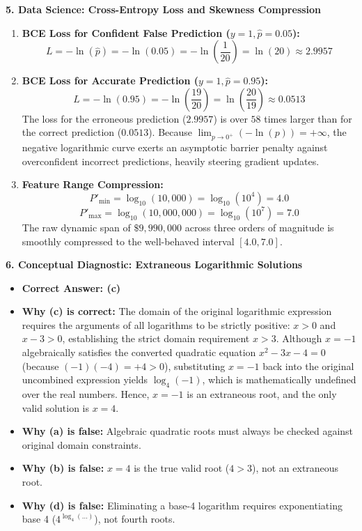 \textbf{5. Data Science: Cross-Entropy Loss and Skewness Compression}
\begin{enumerate}
    \item \textbf{BCE Loss for Confident False Prediction ($y = 1, \hat{p} = 0.05$):}
    $$L = -\ln(\hat{p}) = -\ln(0.05) = -\ln\left(\frac{1}{20}\right) = \ln(20) \approx \mathbf{2.9957}$$
    \item \textbf{BCE Loss for Accurate Prediction ($y = 1, \hat{p} = 0.95$):}
    $$L = -\ln(0.95) = -\ln\left(\frac{19}{20}\right) = \ln\left(\frac{20}{19}\right) \approx \mathbf{0.0513}$$
    The loss for the erroneous prediction ($2.9957$) is over $58$ times larger than for the correct prediction ($0.0513$). Because $\lim_{p \to 0^+} (-\ln(p)) = +\infty$, the negative logarithmic curve exerts an asymptotic barrier penalty against overconfident incorrect predictions, heavily steering gradient updates.
    \item \textbf{Feature Range Compression:}
    $$P'_{\min} = \log_{10}(10{,}000) = \log_{10}(10^4) = \mathbf{4.0}$$
    $$P'_{\max} = \log_{10}(10{,}000{,}000) = \log_{10}(10^7) = \mathbf{7.0}$$
    The raw dynamic span of $\$9{,}990{,}000$ across three orders of magnitude is smoothly compressed to the well-behaved interval $\mathbf{[4.0, 7.0]}$.
\end{enumerate}

\textbf{6. Conceptual Diagnostic: Extraneous Logarithmic Solutions}
\begin{itemize}
    \item \textbf{Correct Answer: (c)}
    \item \textbf{Why (c) is correct:} The domain of the original logarithmic expression requires the arguments of all logarithms to be strictly positive: $x > 0$ and $x - 3 > 0$, establishing the strict domain requirement $x > 3$. Although $x = -1$ algebraically satisfies the converted quadratic equation $x^2 - 3x - 4 = 0$ (because $(-1)(-4) = +4 > 0$), substituting $x = -1$ back into the original uncombined expression yields $\log_4(-1)$, which is mathematically undefined over the real numbers. Hence, $x = -1$ is an extraneous root, and the only valid solution is $x = 4$.
    \item \textbf{Why (a) is false:} Algebraic quadratic roots must always be checked against original domain constraints.
    \item \textbf{Why (b) is false:} $x = 4$ is the true valid root ($4 > 3$), not an extraneous root.
    \item \textbf{Why (d) is false:} Eliminating a base-4 logarithm requires exponentiating base 4 ($4^{\log_4(\dots)}$), not fourth roots.
\end{itemize}

